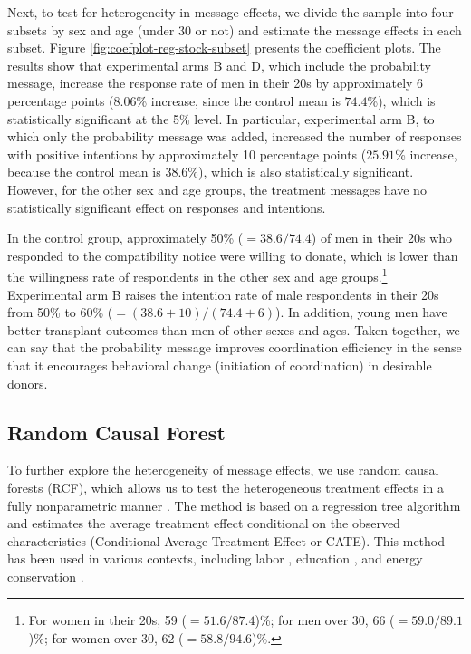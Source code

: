 \documentclass[12pt, a4paper]{article}
\begin{document}
Next, to test for heterogeneity in message effects, we divide the sample into four subsets by sex and age (under 30 or not) and estimate the message effects in each subset. Figure \ref{fig:coefplot-reg-stock-subset} presents the coefficient plots. The results show that experimental arms B and D, which include the probability message, increase the response rate of men in their 20s by approximately 6 percentage points (\(8.06\)\% increase, since the control mean is \(74.4\)\%), which is statistically significant at the 5\% level. In particular, experimental arm B, to which only the probability message was added, increased the number of responses with positive intentions by approximately 10 percentage points (\(25.91\)\% increase, because the control mean is \(38.6\)\%), which is also statistically significant. However, for the other sex and age groups, the treatment messages have no statistically significant effect on responses and intentions.

In the control group, approximately 50\% (\(=38.6/74.4\)) of men in their 20s who responded to the compatibility notice were willing to donate, which is lower than the willingness rate of respondents in the other sex and age groups.\footnote{For women in their 20s, 59 (\(=51.6/87.4\))\%; for men over 30, 66 (\(=59.0/89.1\))\%; for women over 30, 62 (\(=58.8/94.6\))\%.} Experimental arm B raises the intention rate of male respondents in their 20s from 50\% to 60\% (\(=(38.6 + 10)/(74.4 + 6)\)). In addition, young men have better transplant outcomes than men of other sexes and ages. Taken together, we can say that the probability message improves coordination efficiency in the sense that it encourages behavioral change (initiation of coordination) in desirable donors.

\hypertarget{rcf}{%
\subsection{Random Causal Forest}\label{rcf}}

To further explore the heterogeneity of message effects, we use random causal forests (RCF), which allows us to test the heterogeneous treatment effects in a fully nonparametric manner \citep{Athey2016, Wager2018}. The method is based on a regression tree algorithm and estimates the average treatment effect conditional on the observed characteristics (Conditional Average Treatment Effect or CATE). This method has been used in various contexts, including labor \citep{Davis2017}, education \citep{Carlana2022}, and energy conservation \citep{Murakami2022}.
\end{document}

